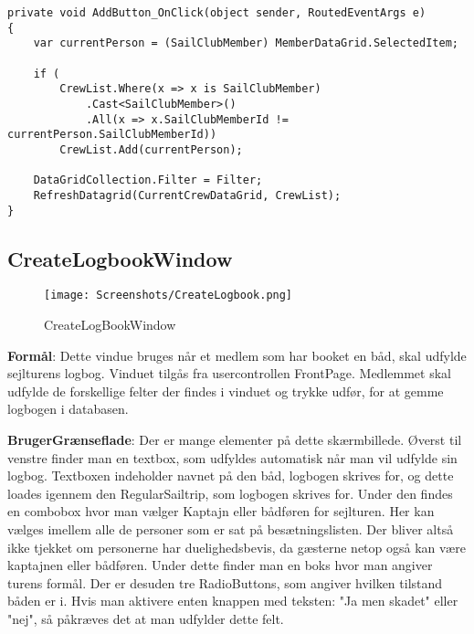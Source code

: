 \begin{lstlisting}[frame=single, caption=Add Member, label=AddMember]
private void AddButton_OnClick(object sender, RoutedEventArgs e)
{
    var currentPerson = (SailClubMember) MemberDataGrid.SelectedItem;

    if (
        CrewList.Where(x => x is SailClubMember)
            .Cast<SailClubMember>()
            .All(x => x.SailClubMemberId != currentPerson.SailClubMemberId))
        CrewList.Add(currentPerson);

    DataGridCollection.Filter = Filter; 
    RefreshDatagrid(CurrentCrewDataGrid, CrewList);
}
\end{lstlisting}

\subsection{CreateLogbookWindow}

\begin{wrapfigure}{r}{0.5\textwidth}
    \label{img:login_interface}
    \vspace{-20pt}
    \begin{center}
        \texttt{[image: Screenshots/CreateLogbook.png]}
    \end{center}
    \vspace{-15pt}
    \caption{CreateLogBookWindow}
    \vspace{-30pt}
\end{wrapfigure}

\textbf{Formål}: Dette vindue bruges når et medlem som har booket en båd, skal udfylde sejlturens logbog. Vinduet tilgås fra usercontrollen FrontPage. Medlemmet skal udfylde de forskellige felter der findes i vinduet og trykke udfør, for at gemme logbogen i databasen.

\textbf{BrugerGrænseflade}: Der er mange elementer på dette skærmbillede. Øverst til venstre finder man en textbox, som udfyldes automatisk når man vil udfylde sin logbog. 
Textboxen indeholder navnet på den båd, logbogen skrives for, og dette loades igennem den RegularSailtrip, som logbogen skrives for.
Under den findes en combobox hvor man vælger Kaptajn eller bådføren for sejlturen.
Her kan vælges imellem alle de personer som er sat på besætningslisten. 
Der bliver altså ikke tjekket om personerne har duelighedsbevis, da gæsterne netop også kan være kaptajnen eller bådføren.
Under dette finder man en boks hvor man angiver turens formål. 
Der er desuden tre RadioButtons, som angiver hvilken tilstand båden er i. 
Hvis man aktivere enten knappen med teksten: "Ja men skadet" eller "nej", så påkræves det at man udfylder dette felt. 

